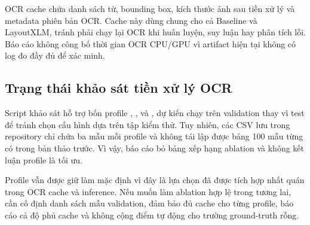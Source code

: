 OCR cache chứa danh sách từ, bounding box, kích thước ảnh sau tiền xử lý và metadata phiên bản OCR. Cache này dùng chung cho cả Baseline và LayoutXLM, tránh phải chạy lại OCR khi huấn luyện, suy luận hay phân tích lỗi. Báo cáo không công bố thời gian OCR CPU/GPU vì artifact hiện tại không có log đo đầy đủ để xác minh.

\subsection{Trạng thái khảo sát tiền xử lý OCR}
\label{subsec:ocr-ablation}

Script khảo sát hỗ trợ bốn profile , ,  và , dự kiến chạy trên validation thay vì test để tránh chọn cấu hình dựa trên tập kiểm thử. Tuy nhiên, các CSV lưu trong repository chỉ chứa ba mẫu mỗi profile và không tái lập được bảng 100 mẫu từng có trong bản thảo trước. Vì vậy, báo cáo bỏ bảng xếp hạng ablation và không kết luận profile  là tối ưu.

Profile  vẫn được giữ làm mặc định vì đây là lựa chọn đã được tích hợp nhất quán trong OCR cache và inference. Nếu muốn làm ablation hợp lệ trong tương lai, cần cố định danh sách mẫu validation, đảm bảo đủ cache cho từng profile, báo cáo cả độ phủ cache và không cộng điểm tự động cho trường ground-truth rỗng.
